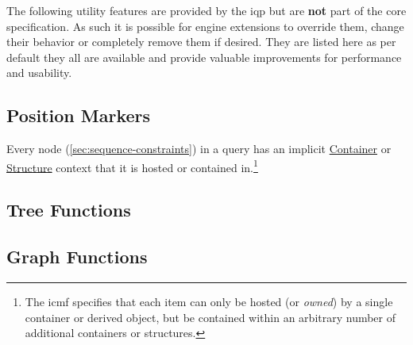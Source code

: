 \documentclass[11pt,a4paper,portrait]{article}
\newcommand{\repoUrl}{https://github.com/ICARUS-tooling/icarus2-modeling-framework/blob/dev/}
\newcommand{\modelsUrl}{\repoUrl icarus2-model-api/src/main/java/de/ims/icarus2/model/api/}
\newcommand{\repoLink}[2]{\href{#1}{#2}}
\begin{document}
The following utility features are provided by the \ac{iqp} but are \textbf{not} part of the core specification. 
As such it is possible for engine extensions to override them, change their behavior or completely remove them if desired.
They are listed here as per default they all are available and provide valuable improvements for performance and usability.

\subsection{Position Markers}
\label{sec:position-markers}

Every node (\ref{sec:sequence-constraints}) in a query has an implicit \repoLink{\modelsUrl /members/container/Container.java}{Container} or \repoLink{/members/structure/Structure.java}{Structure} context that it is hosted  or contained in.\footnote{The \ac{icmf} specifies that each item can only be hosted (or \textit{owned}) by a single container or derived object, but be contained within an arbitrary number of additional containers or structures.}

\subsection{Tree Functions}
\label{sec:tree-functions}

\subsection{Graph Functions}
\label{sec:graph-functions}
\end{document}
